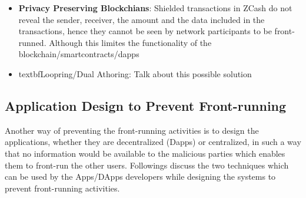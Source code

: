 \begin{itemize}
\item{\textbf{Privacy Preserving Blockchians}: Shielded transactions in ZCash do not reveal the sender, receiver, the amount and the data included in the transactions, hence they cannot be seen by network participants to be front-runned. Although this limites the functionality of the blockchain/smartcontracts/dapps }
\item{textbf{Loopring/Dual Athoring}: Talk about this possible solution}

\end{itemize}


\subsection{Application Design to Prevent Front-running}

Another way of preventing the front-running activities is to design the applications, whether they are decentralized (Dapps) or centralized, in such a way that no information would be available to the malicious parties which enables them to front-run the other users.
Followings discuss the two techniques which can be used by the Apps/DApps developers while designing the systems to prevent front-running activities.

